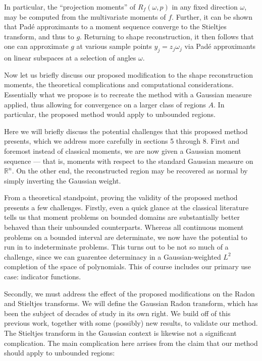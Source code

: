 \documentclass{amsart}
\theoremstyle{remark}
\numberwithin{equation}{section}
\newcommand{\RR}{\mathbb{R}}
\begin{document}
In particular, the ``projection moments'' of $R_f(\omega, p)$ in any fixed direction $\omega$, may be computed from the multivariate moments of $f$. Further, it can be shown that Pad\'e approximants to a moment sequence converge to the Stieltjes transform, and thus to $g$. Returning to shape reconstruction, it then follows that one can approximate $g$ at various sample points $y_j = z_j\omega_j$ via Pad\'e approximants on linear subspaces at a selection of angles $\omega$.

Now let us briefly discuss our proposed modification to the shape reconstruction moments, the theoretical complications and computational considerations. Essentially what we propose is to recreate the method with a Gaussian measure applied, thus allowing for convergence on a larger class of regions $A$. In particular, the proposed method would apply to unbounded regions. 

Here we will briefly discuss the potential challenges that this proposed method presents, which we address more carefully in sections 5 through 8. First and foremost instead of classical moments, we are now given a Gaussian moment sequence — that is, moments with respect to the standard Gaussian measure on $\RR^n$. On the other end, the reconstructed region may be recovered as normal by simply inverting the Gaussian weight. 

From a theoretical standpoint, proving the validity of the proposed method presents a few challenges. Firstly, even a quick glance at the classical literature tells us that moment problems on bounded domains are substantially better behaved than their unbounded counterparts. Whereas all continuous moment problems on a bounded interval are determinate, we now have the potential to run in to indeterminate problems. This turns out to be not so much of a challenge, since we can guarentee determinacy in a Gaussian-weighted $L^2$ completion of the space of polynomials. This of course includes our primary use case: indicator functions. 

Secondly, we must address the effect of the proposed modifications on the Radon and Stieltjes transforms. We will define the Gaussian Radon transform, which has been the subject of decades of study in its own right. We build off of this previous work, together with some (possibly) new results, to validate our method. The Stieltjes transform in the Gaussian context is likewise not a significant complication. The main complication here arrises from the claim that our method should apply to unbounded regions:
\end{document}
